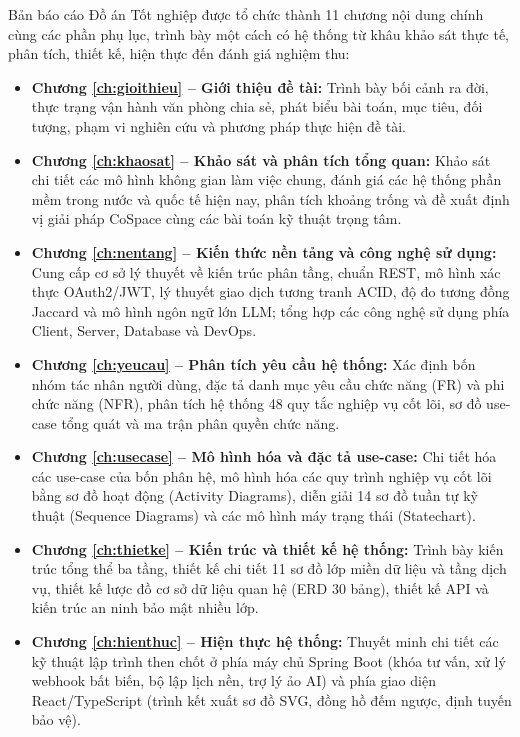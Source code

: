 Bản báo cáo Đồ án Tốt nghiệp được tổ chức thành 11 chương nội dung chính cùng các phần phụ lục, trình bày một cách có hệ thống từ khâu khảo sát thực tế, phân tích, thiết kế, hiện thực đến đánh giá nghiệm thu:
\begin{itemize}
    \item \textbf{Chương \ref{ch:gioithieu} -- Giới thiệu đề tài:} Trình bày bối cảnh ra đời, thực trạng vận hành văn phòng chia sẻ, phát biểu bài toán, mục tiêu, đối tượng, phạm vi nghiên cứu và phương pháp thực hiện đề tài.
    \item \textbf{Chương \ref{ch:khaosat} -- Khảo sát và phân tích tổng quan:} Khảo sát chi tiết các mô hình không gian làm việc chung, đánh giá các hệ thống phần mềm trong nước và quốc tế hiện nay, phân tích khoảng trống và đề xuất định vị giải pháp CoSpace cùng các bài toán kỹ thuật trọng tâm.
    \item \textbf{Chương \ref{ch:nentang} -- Kiến thức nền tảng và công nghệ sử dụng:} Cung cấp cơ sở lý thuyết về kiến trúc phân tầng, chuẩn REST, mô hình xác thực OAuth2/JWT, lý thuyết giao dịch tương tranh ACID, độ đo tương đồng Jaccard và mô hình ngôn ngữ lớn LLM; tổng hợp các công nghệ sử dụng phía Client, Server, Database và DevOps.
    \item \textbf{Chương \ref{ch:yeucau} -- Phân tích yêu cầu hệ thống:} Xác định bốn nhóm tác nhân người dùng, đặc tả danh mục yêu cầu chức năng (FR) và phi chức năng (NFR), phân tích hệ thống 48 quy tắc nghiệp vụ cốt lõi, sơ đồ use-case tổng quát và ma trận phân quyền chức năng.
    \item \textbf{Chương \ref{ch:usecase} -- Mô hình hóa và đặc tả use-case:} Chi tiết hóa các use-case của bốn phân hệ, mô hình hóa các quy trình nghiệp vụ cốt lõi bằng sơ đồ hoạt động (Activity Diagrams), diễn giải 14 sơ đồ tuần tự kỹ thuật (Sequence Diagrams) và các mô hình máy trạng thái (Statechart).
    \item \textbf{Chương \ref{ch:thietke} -- Kiến trúc và thiết kế hệ thống:} Trình bày kiến trúc tổng thể ba tầng, thiết kế chi tiết 11 sơ đồ lớp miền dữ liệu và tầng dịch vụ, thiết kế lược đồ cơ sở dữ liệu quan hệ (ERD 30 bảng), thiết kế API và kiến trúc an ninh bảo mật nhiều lớp.
    \item \textbf{Chương \ref{ch:hienthuc} -- Hiện thực hệ thống:} Thuyết minh chi tiết các kỹ thuật lập trình then chốt ở phía máy chủ Spring Boot (khóa tư vấn, xử lý webhook bất biến, bộ lập lịch nền, trợ lý ảo AI) và phía giao diện React/TypeScript (trình kết xuất sơ đồ SVG, đồng hồ đếm ngược, định tuyến bảo vệ).

\end{itemize}
